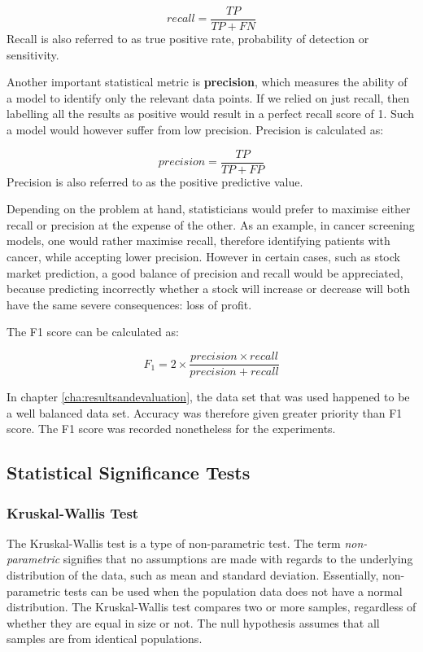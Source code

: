 \documentclass{UoYCSproject}
\begin{document}
\begin{equation}
recall=\frac{TP}{TP + FN}
\end{equation}
Recall is also referred to as true positive rate, probability of detection or sensitivity.

Another important statistical metric is \textbf{precision}, which measures the ability of a model to identify only the relevant data points. If we relied on just recall, then labelling all the results as positive would result in a perfect recall score of 1. Such a model would however suffer from low precision. Precision is calculated as:

\begin{equation}
precision=\frac{TP}{TP + FP}
\end{equation}
Precision is also referred to as the positive predictive value.

Depending on the problem at hand, statisticians would prefer to maximise either recall or precision at the expense of the other. As an example, in cancer screening models, one would rather maximise recall, therefore identifying patients with cancer, while accepting lower precision. However in certain cases, such as stock market prediction, a good balance of precision and recall would be appreciated, because predicting incorrectly whether a stock will increase or decrease will both have the same severe consequences: loss of profit.

The F1 score can be calculated as:

\begin{equation}
\label{eq:f1}
F_1=2 \times \frac{precision \times recall}{precision + recall}
\end{equation}

In chapter \ref{cha:resultsandevaluation}, the data set that was used happened to be a well balanced data set. Accuracy was therefore given greater priority than F1 score. The F1 score was recorded nonetheless for the experiments.  

\subsection{Statistical Significance Tests}
\label{sec:statisticalsignificancetest}
\subsubsection{Kruskal-Wallis Test}
The Kruskal-Wallis test is a type of non-parametric test. The term \textit{non-parametric} signifies that no assumptions are made with regards to the underlying distribution of the data, such as mean and standard deviation. Essentially, non-parametric tests can be used when the population data does not have a normal distribution. The Kruskal-Wallis test compares two or more samples, regardless of whether they are equal in size or not. The null hypothesis assumes that all samples are from identical populations.  
\end{document}
